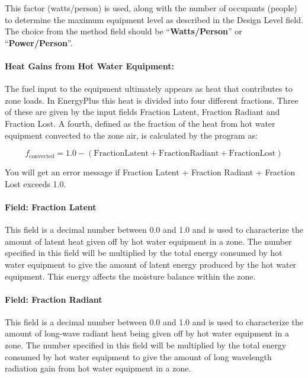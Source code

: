 This factor (watts/person) is used, along with the number of occupants (people) to determine the maximum equipment level as described in the Design Level field. The choice from the method field should be ``\textbf{Watts/Person}'' or ``\textbf{Power/Person}''.

\paragraph{Heat Gains from Hot Water Equipment:}\label{heat-gains-from-hot-water-equipment-hw-definition}

The fuel input to the equipment ultimately appears as heat that contributes to zone loads. In EnergyPlus this heat is divided into four different fractions. Three of these are given by the input fields Fraction Latent, Fraction Radiant and Fraction Lost. A fourth, defined as the fraction of the heat from hot water equipment convected to the zone air, is calculated by the program as:

\begin{equation}
  f_{\mathrm{convected}} = 1.0 - (\mathrm{Fraction Latent} + \mathrm{Fraction Radiant} + \mathrm{Fraction Lost})
\end{equation}

You will get an error message if Fraction Latent + Fraction Radiant + Fraction Lost exceeds 1.0.

\paragraph{Field: Fraction Latent}\label{field-fraction-latent-2-hw-definition}

This field is a decimal number between 0.0 and 1.0 and is used to characterize the amount of latent heat given off by hot water equipment in a zone. The number specified in this field will be multiplied by the total energy consumed by hot water equipment to give the amount of latent energy produced by the hot water equipment. This energy affects the moisture balance within the zone.

\paragraph{Field: Fraction Radiant}\label{field-fraction-radiant-4-hw-definition}

This field is a decimal number between 0.0 and 1.0 and is used to characterize the amount of long-wave radiant heat being given off by hot water equipment in a zone. The number specified in this field will be multiplied by the total energy consumed by hot water equipment to give the amount of long wavelength radiation gain from hot water equipment in a zone.

